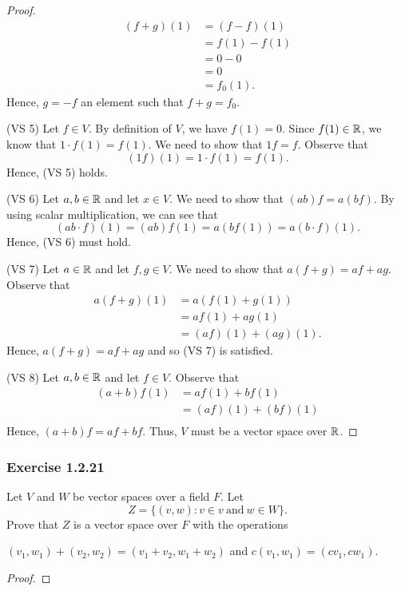 \begin{proof}
    \begin{align*}
        (f+g)(1)  &= (f - f)(1)  \\
                  &= f(1) - f(1) \\
                  &= 0 - 0  \\
                  &= 0 \\
                  &= f_{0}(1).
    \end{align*}
    Hence, \( g = -f  \) an element such that \( f + g = f_{0} \).
\item[(VS 5)] Let \( f \in V  \). By definition of \( V  \), we have  \( f(1) = 0   \). Since \( f(1) \in \mathbb{R}  \), we know that \( 1 \cdot f(1) = f(1) \). We need to show that \( 1f = f  \). Observe that \[  (1f)(1) = 1 \cdot f(1) = f(1).  \]
    Hence, (VS 5) holds.
\item[(VS 6)] Let \( a,b \in \mathbb{R}  \) and let \( x \in V  \). We need to show that \( (ab)f = a(bf)  \). By using scalar multiplication, we can see that 
    \[  (ab \cdot f) (1) = (ab)f(1) = a (bf(1)) = a(b \cdot f)(1). \]
    Hence,  (VS 6) must hold.
\item[(VS 7)] Let \( a \in \mathbb{R}  \) and let \( f,g \in V  \). We need to show that \( a(f+g) = af + ag \). Observe that 
    \begin{align*}
        a(f+g)(1) &= a (f(1) + g(1))  \\
                  &= a f(1) + a g(1) \\
                  &=  (af)(1) + (ag)(1).
    \end{align*}
    Hence, \( a(f+g) = af + ag \) and so (VS 7) is satisfied.
\item[(VS 8)] Let \( a,b \in \mathbb{R}  \) and let \( f \in V  \). Observe that 
    \begin{align*}
        (a+b)f(1) &= a f(1) + b f(1)  \\
                  &=  (af)(1) + (bf)(1) \\
    \end{align*}
    Hence, \( (a+b)f =  af + bf  \). 
Thus, \( V  \) must be a vector space over \( \mathbb{R}  \).
\end{proof}

\subsubsection{Exercise 1.2.21} 
Let \( V  \) and \( W  \) be vector spaces over a field \( F  \). Let 
\[  Z = \{ (v,w): v \in v \ \text{and} \  w \in W  \}. \]
Prove that \( Z  \) is a vector space over \( F  \) with the operations   
\begin{center}
   \( (v_{1}, w_{1}) + (v_{2}, w_{2}) = (v_{1} + v_{2} , w_{1} + w_{2} ) \) and \( c(v_{1}, w_{1} ) = (cv_{1}, cw_{1} ) \). 
\end{center}
\begin{proof}

\end{proof}




